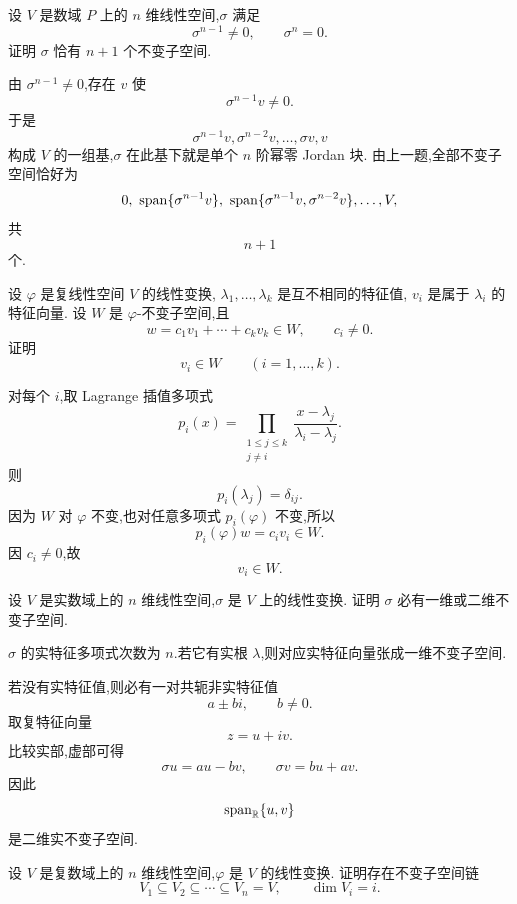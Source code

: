 \begin{example}[\markstar]
设 $V$ 是数域 $P$ 上的 $n$ 维线性空间,$\sigma$ 满足
\[
\sigma^{n-1}\neq0,\qquad
\sigma^n=0.
\]
证明 $\sigma$ 恰有 $n+1$ 个不变子空间.
\end{example}
\exampleblank

\begin{solution}
由 $\sigma^{n-1}\neq0$,存在 $v$ 使
\[
\sigma^{n-1}v\neq0.
\]
于是
\[
\sigma^{n-1}v,\sigma^{n-2}v,\ldots,\sigma v,v
\]
构成 $V$ 的一组基,$\sigma$ 在此基下就是单个 $n$ 阶幂零 Jordan 块.
由上一题,全部不变子空间恰好为
\[
0,\ 
\Span\{\sigma^{n-1}v\},\
\Span\{\sigma^{n-1}v,\sigma^{n-2}v\},
\ldots,V,
\]
共
\[
\boxed{n+1}
\]
个.
\end{solution}


\begin{example}
设 $\varphi$ 是复线性空间 $V$ 的线性变换,
$\lambda_1,\ldots,\lambda_k$ 是互不相同的特征值,
$v_i$ 是属于 $\lambda_i$ 的特征向量.
设 $W$ 是 $\varphi$-不变子空间,且
\[
w=c_1v_1+\cdots+c_kv_k\in W,
\qquad
c_i\neq0.
\]
证明
\[
v_i\in W\qquad(i=1,\ldots,k).
\]
\end{example}
\exampleblank

\begin{solution}
对每个 $i$,取 Lagrange 插值多项式
\[
p_i(x)
=
\prod_{\substack{1\leq j\leq k\\j\neq i}}
\dfrac{x-\lambda_j}{\lambda_i-\lambda_j}.
\]
则
\[
p_i(\lambda_j)=\delta_{ij}.
\]
因为 $W$ 对 $\varphi$ 不变,也对任意多项式 $p_i(\varphi)$ 不变,所以
\[
p_i(\varphi)w
=
c_i v_i
\in W.
\]
因 $c_i\neq0$,故
\[
v_i\in W.
\]
\end{solution}


\begin{example}[\markstar]
设 $V$ 是实数域上的 $n$ 维线性空间,$\sigma$ 是 $V$ 上的线性变换.
证明 $\sigma$ 必有一维或二维不变子空间.
\end{example}
\exampleblank

\begin{solution}
$\sigma$ 的实特征多项式次数为 $n$.若它有实根 $\lambda$,则对应实特征向量张成一维不变子空间.

若没有实特征值,则必有一对共轭非实特征值
\[
a\pm bi,\qquad b\neq0.
\]
取复特征向量
\[
z=u+iv.
\]
比较实部,虚部可得
\[
\sigma u=au-bv,\qquad
\sigma v=bu+av.
\]
因此
\[
\operatorname{span}_{\mathbb{R}}\{u,v\}
\]
是二维实不变子空间.
\end{solution}


\begin{example}
设 $V$ 是复数域上的 $n$ 维线性空间,$\varphi$ 是 $V$ 的线性变换.
证明存在不变子空间链
\[
V_1\subseteq V_2\subseteq\cdots\subseteq V_n=V,
\qquad
\dim V_i=i.
\]
\end{example}
\exampleblank

